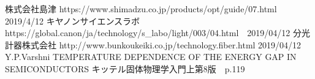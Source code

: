 \documentclass[11pt,a4j,uplatex]{jsarticle}
\begin{document}
\newpage
\begin{thebibliography}{9}
 株式会社島津 https://www.shimadzu.co.jp/products/opt/guide/07.html 2019/4/12
  キヤノンサイエンスラボ https://global.canon/ja/technology/s\_labo/light/003/04.html　2019/04/12
  分光計器株式会社 http://www.bunkoukeiki.co.jp/technology.fiber.html 2019/04/12
 Y.P.Varshni TEMPERATURE DEPENDENCE OF THE ENERGY GAP IN SEMICONDUCTORS
 キッテル固体物理学入門上第8版　p.119


\end{thebibliography}
\end{document}
